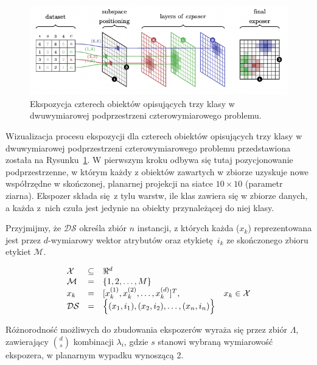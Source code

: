 \begin{figure}[!htb]
	\centering
	\includegraphics[width=\textwidth]{figures/exposer-projection}
	\caption{Ekspozycja czterech obiektów opisujących trzy klasy w dwuwymiarowej podprzestrzeni czterowymiarowego problemu.}\label{fig:exposer-projection}
\end{figure}

Wizualizacja procesu ekspozycji dla czterech obiektów opisujących trzy klasy w dwuwymiarowej podprzestrzeni czterowymiarowego problemu przedstawiona została na Rysunku~\ref{fig:exposer-projection}. W pierwszym kroku odbywa się tutaj pozycjonowanie podprzestrzenne, w którym każdy z obiektów zawartych w zbiorze uzyskuje nowe współrzędne w skończonej, planarnej projekcji na siatce $10\times 10$ (parametr ziarna). Ekspozer składa się z tylu warstw, ile klas zawiera się w zbiorze danych, a każda z~nich czuła jest jedynie na obiekty przynależącej do niej klasy.  

Przyjmijmy, że $\mathcal{DS}$ określa zbiór $n$ instancji, z których każda ($x_k$) reprezentowana jest przez $d$-wymiarowy wektor atrybutów oraz etykietę $i_k$ ze skończonego zbioru etykiet $\mathcal{M}$.

\begin{equation}
	\begin{array}[b]{llll}
		\mathcal{X} & \subseteq & \Re^d\\
		\mathcal{M}&=&\{1, 2, \ldots, M\}\\
		x_k & = & [x_k^{(1)}, x_k^{(2)}, \ldots, x_k^{(d)}]^{T}, & x_k \in \mathcal{X} \\
		\mathcal{DS} & = & \Big\{(x_1,i_1),(x_2,i_2),\ldots,(x_n,i_n)\Big\}
	\end{array}
\end{equation}

Różnorodność możliwych do zbudowania ekspozerów wyraża się przez zbiór $\Lambda$, zawierający ${d \choose s}$ kombinacji $\lambda_i$, gdzie $s$ stanowi wybraną wymiarowość ekspozera, w planarnym wypadku wynoszącą 2.

